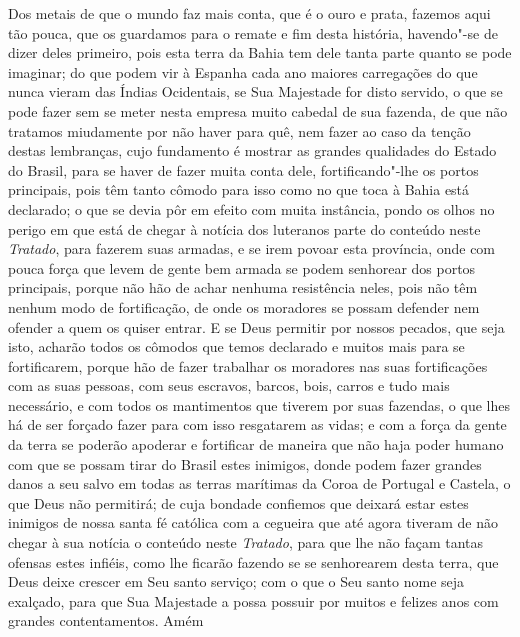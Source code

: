 Dos metais de que o mundo faz mais conta, que é o ouro e prata, fazemos aqui tão pouca,
que os guardamos para o remate e fim desta história, havendo"-se de dizer deles primeiro,
pois esta terra da Bahia tem dele tanta parte quanto se pode imaginar; do que podem vir à
Espanha cada ano maiores carregações do que nunca vieram das Índias Ocidentais, se Sua
Majestade for disto servido, o que se pode fazer sem se meter nesta empresa muito cabedal
de sua fazenda, de que não tratamos miudamente por não haver para quê, nem fazer ao caso
da tenção destas lembranças, cujo fundamento é mostrar as grandes qualidades do Estado do
Brasil, para se haver de fazer muita conta dele, fortificando"-lhe os portos principais,
pois têm tanto cômodo para isso como no que toca à Bahia está declarado; o que se devia
pôr em efeito com muita instância, pondo os olhos no perigo em que está de chegar à
notícia dos luteranos parte do conteúdo neste \textit{Tratado}, para fazerem suas armadas,
e se irem povoar esta província, onde com pouca força que levem de gente bem armada se
podem senhorear dos portos principais, porque não hão de achar nenhuma resistência neles,
pois não têm nenhum modo de fortificação, de onde os moradores se possam defender nem
ofender a quem os quiser entrar. E se Deus permitir por nossos pecados, que seja isto,
acharão todos os cômodos que temos declarado e muitos mais para se fortificarem, porque
hão de fazer trabalhar os moradores nas suas fortificações com as suas pessoas, com seus
escravos, barcos, bois, carros e tudo mais necessário, e com todos os mantimentos que
tiverem por suas fazendas, o que lhes há de ser forçado fazer para com isso resgatarem as
vidas; e com a força da gente da terra se poderão apoderar e fortificar de maneira que não
haja poder humano com que se possam tirar do Brasil estes inimigos, donde podem fazer
grandes danos a seu salvo em todas as terras marítimas da Coroa de Portugal e Castela, o
que Deus não permitirá; de cuja bondade confiemos que deixará estar estes inimigos de
nossa santa fé católica com a cegueira que até agora tiveram de não chegar à sua notícia o
conteúdo neste \textit{Tratado}, para que lhe não façam tantas ofensas estes infiéis, como
lhe ficarão fazendo se se senhorearem desta terra, que Deus deixe crescer em Seu santo
serviço; com o que o Seu santo nome seja exalçado, para que Sua Majestade a possa possuir
por muitos e felizes anos com grandes contentamentos. Amém


